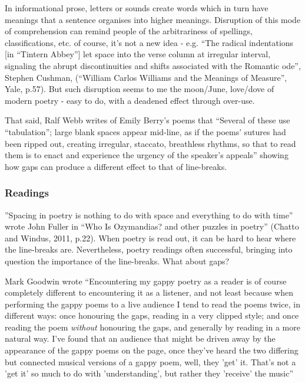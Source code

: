 \documentclass[11pt]{article}
\begin{document}
\begin{itemize}
In informational prose, letters or sounds create words which in turn have meanings that a sentence organises into higher meanings. Disruption of this mode of comprehension can remind people of the arbitrariness of spellings, classifications, etc. of course, it's not a new idea - e.g. ``The radical indentations [in ``Tintern Abbey''] let space into the verse column at irregular interval, signaling the abrupt discontinuities and shifts associated with the Romantic ode'', Stephen Cushman, (``William Carlos Williams and the Meanings of Measure'', Yale, p.57). But such disruption seems to me the moon/June, love/dove of modern poetry - easy to do, with a deadened effect through over-use.

That said, Ralf Webb writes of Emily Berry's poems that ``Several of these use “tabulation”; large blank spaces appear mid-line, as if the poems’ sutures had been ripped out, creating irregular, staccato, breathless rhythms, so that to read them is to enact and experience the urgency of the speaker’s appeals'' showing how gaps can produce a different effect to that of line-breaks.

\end{itemize}


\subsubsection*{Readings}
''Spacing in poetry is nothing to do with space and everything to do with time'' wrote John Fuller in ``Who Is Ozymandias? and other puzzles in poetry'' (Chatto and Windus, 2011, p.22). When poetry is read out, it can be hard to hear where the line-breaks are. Nevertheless, poetry readings often successful, bringing into question the importance of the line-breaks. What about gaps?

Mark Goodwin wrote ``Encountering my gappy poetry as a reader is of course completely different to encountering it as a listener, and not least because when performing the gappy poems to a live audience I tend to read the poems twice, in different ways: once honouring the gaps, reading in a very clipped style; and once reading the poem \textit{without} honouring the gaps, and generally by reading in a more natural way. I've found that an audience that might be driven away by the appearance of the gappy poems on the page, once they've heard the two differing but connected musical versions of a gappy poem, well, they 'get' it. That's not a 'get it' so much to do with 'understanding', but rather they 'receive' the music''
\end{document}
